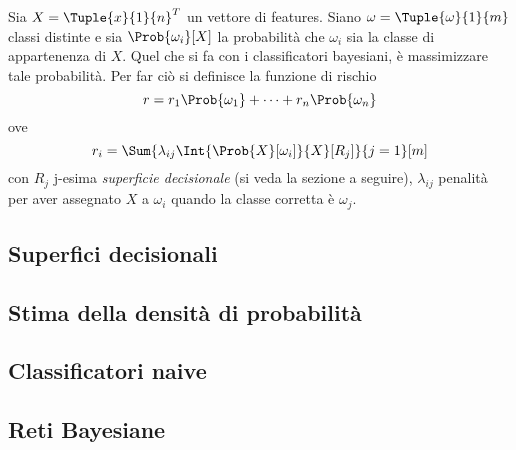 \documentclass{subfiles}
\begin{document}
Sia \(X = \Tuple{x}{1}{n}^{T}\) un vettore di features.
Siano \(\omega = \Tuple{\omega}{1}{m}\) classi distinte e sia \(\Prob{\omega_{i}}[X]\) la probabilità che \(\omega_{i}\) sia la classe di appartenenza di \(X\).
Quel che si fa con i classificatori bayesiani, è massimizzare tale probabilità.
Per far ciò si definisce la funzione di rischio
\[
    r = r_{1} \Prob{\omega_{1}} + \cdots + r_{n} \Prob{\omega_{n}}
\]
ove
\[
    r_{i} = \Sum{\lambda_{ij} \Int{\Prob{X}[\omega_{i}]}{X}[R_{j}]}{j = 1}[m]
\]
con \(R_{j}\) j-esima \emph{superficie decisionale} (si veda la sezione a seguire),
\(\lambda_{ij}\) penalità per aver assegnato \(X\) a \(\omega_{i}\) quando la classe corretta è \(\omega_{j}\).

\subsection{Superfici decisionali}


\subsection{Stima della densità di probabilità}


\subsection{Classificatori naive}


\subsection{Reti Bayesiane}

\end{document}
